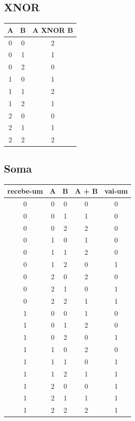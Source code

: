 \documentclass[12pt]{article}
\begin{document}
\subsection{XNOR}
\centering
\begin{tabular}{|c|c|c|}
	\hline
	\textbf{A} & \textbf{B} & \textbf{A} XNOR \textbf{B}\\\hline
	0&0&2\\\hline
	0&1&1\\\hline
	0&2&0\\\hline
	1&0&1\\\hline
	1&1&2\\\hline
	1&2&1\\\hline
	2&0&0\\\hline
	2&1&1\\\hline
	2&2&2\\\hline
\end{tabular}
\subsection{Soma}
\centering
\begin{tabular}{|c|c|c|c|c|}
	\hline
	recebe-um&\textbf{A} & \textbf{B} & \textbf{A} + \textbf{B} & vai-um\\\hline
	0&0&0&0&0\\\hline
	0&0&1&1&0\\\hline
	0&0&2&2&0\\\hline
	0&1&0&1&0\\\hline
	0&1&1&2&0\\\hline
	0&1&2&0&1\\\hline
	0&2&0&2&0\\\hline
	0&2&1&0&1\\\hline
	0&2&2&1&1\\\hline
	1&0&0&1&0\\\hline
	1&0&1&2&0\\\hline
	1&0&2&0&1\\\hline
	1&1&0&2&0\\\hline
	1&1&1&0&1\\\hline
	1&1&2&1&1\\\hline
	1&2&0&0&1\\\hline
	1&2&1&1&1\\\hline
	1&2&2&2&1\\\hline
\end{tabular}
\end{document}
